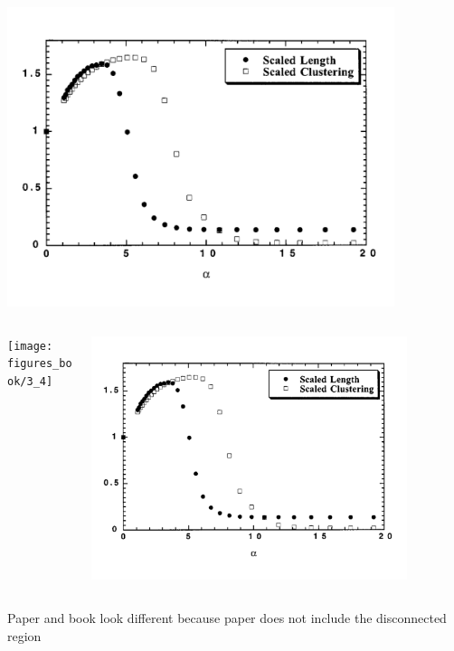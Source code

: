 \documentclass[aspectratio=169]{beamer}
\begin{document}
\begin{frame}

\begin{center}
\includegraphics[width = 0.85\textwidth]{figures/watts_networks_1999_fig5}
\end{center}


\end{frame}
\begin{frame}

\begin{columns}
\begin{column}{0.4\textwidth}
\begin{center}
\texttt{[image: figures\_book/3\_4]}
\end{center}
\end{column}
\begin{column}{0.6\textwidth}
\begin{center}
\includegraphics[width = 0.85\textwidth]{figures/watts_networks_1999_fig5}
\end{center}
\end{column}
\end{columns}

\vfill

Paper and book look different because paper does not include the disconnected region

\end{frame}
\end{document}

